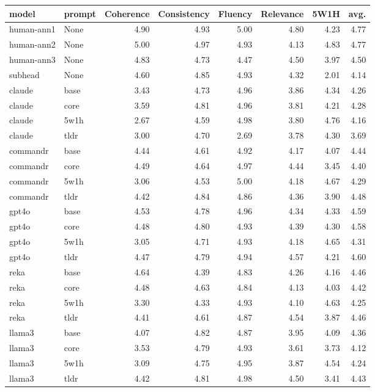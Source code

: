 \begin{tabular}{llrrrrrr}
\toprule
model & prompt & Coherence & Consistency & Fluency & Relevance & 5W1H & avg. \\
\midrule
human-ann1 & None & 4.90 & 4.93 & 5.00 & 4.80 & 4.23 & 4.77 \\
human-ann2 & None & 5.00 & 4.97 & 4.93 & 4.13 & 4.83 & 4.77 \\
human-ann3 & None & 4.83 & 4.73 & 4.47 & 4.50 & 3.97 & 4.50 \\
subhead & None & 4.60 & 4.85 & 4.93 & 4.32 & 2.01 & 4.14 \\
claude & base & 3.43 & 4.73 & 4.96 & 3.86 & 4.34 & 4.26 \\
claude & core & 3.59 & 4.81 & 4.96 & 3.81 & 4.21 & 4.28 \\
claude & 5w1h & 2.67 & 4.59 & 4.98 & 3.80 & 4.76 & 4.16 \\
claude & tldr & 3.00 & 4.70 & 2.69 & 3.78 & 4.30 & 3.69 \\
commandr & base & 4.44 & 4.61 & 4.92 & 4.17 & 4.07 & 4.44 \\
commandr & core & 4.49 & 4.64 & 4.97 & 4.44 & 3.45 & 4.40 \\
commandr & 5w1h & 3.06 & 4.53 & 5.00 & 4.18 & 4.67 & 4.29 \\
commandr & tldr & 4.42 & 4.84 & 4.86 & 4.36 & 3.90 & 4.48 \\
gpt4o & base & 4.53 & 4.78 & 4.96 & 4.34 & 4.33 & 4.59 \\
gpt4o & core & 4.48 & 4.80 & 4.93 & 4.39 & 4.30 & 4.58 \\
gpt4o & 5w1h & 3.05 & 4.71 & 4.93 & 4.18 & 4.65 & 4.31 \\
gpt4o & tldr & 4.47 & 4.79 & 4.94 & 4.57 & 4.21 & 4.60 \\
reka & base & 4.64 & 4.39 & 4.83 & 4.26 & 4.16 & 4.46 \\
reka & core & 4.48 & 4.63 & 4.84 & 4.13 & 4.03 & 4.42 \\
reka & 5w1h & 3.30 & 4.33 & 4.93 & 4.10 & 4.63 & 4.25 \\
reka & tldr & 4.41 & 4.61 & 4.87 & 4.54 & 3.87 & 4.46 \\
llama3 & base & 4.07 & 4.82 & 4.87 & 3.95 & 4.09 & 4.36 \\
llama3 & core & 3.53 & 4.79 & 4.93 & 3.61 & 3.73 & 4.12 \\
llama3 & 5w1h & 3.09 & 4.75 & 4.95 & 3.87 & 4.54 & 4.24 \\
llama3 & tldr & 4.42 & 4.81 & 4.98 & 4.50 & 3.41 & 4.43 \\
\bottomrule
\end{tabular}
